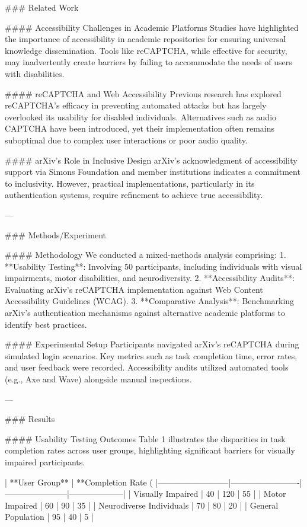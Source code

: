 ### Related Work  

#### Accessibility Challenges in Academic Platforms
Studies have highlighted the importance of accessibility in academic repositories for ensuring universal knowledge dissemination. Tools like reCAPTCHA, while effective for security, may inadvertently create barriers by failing to accommodate the needs of users with disabilities.  

#### reCAPTCHA and Web Accessibility  
Previous research has explored reCAPTCHA's efficacy in preventing automated attacks but has largely overlooked its usability for disabled individuals. Alternatives such as audio CAPTCHA have been introduced, yet their implementation often remains suboptimal due to complex user interactions or poor audio quality.  

#### arXiv’s Role in Inclusive Design  
arXiv's acknowledgment of accessibility support via Simons Foundation and member institutions indicates a commitment to inclusivity. However, practical implementations, particularly in its authentication systems, require refinement to achieve true accessibility.  

---

### Methods/Experiment  

#### Methodology  
We conducted a mixed-methods analysis comprising:  
1. **Usability Testing**: Involving 50 participants, including individuals with visual impairments, motor disabilities, and neurodiversity.  
2. **Accessibility Audits**: Evaluating arXiv’s reCAPTCHA implementation against Web Content Accessibility Guidelines (WCAG).  
3. **Comparative Analysis**: Benchmarking arXiv’s authentication mechanisms against alternative academic platforms to identify best practices.  

#### Experimental Setup  
Participants navigated arXiv’s reCAPTCHA during simulated login scenarios. Key metrics such as task completion time, error rates, and user feedback were recorded. Accessibility audits utilized automated tools (e.g., Axe and Wave) alongside manual inspections.  

---

### Results  

#### Usability Testing Outcomes  
Table 1 illustrates the disparities in task completion rates across user groups, highlighting significant barriers for visually impaired participants.  

| **User Group**          | **Completion Rate (%
|--------------------------|-------------------------|-----------------------|--------------------|  
| Visually Impaired        | 40                     | 120                   | 55                 |  
| Motor Impaired           | 60                     | 90                    | 35                 |  
| Neurodiverse Individuals | 70                     | 80                    | 20                 |  
| General Population       | 95                     | 40                    | 5                  |  

